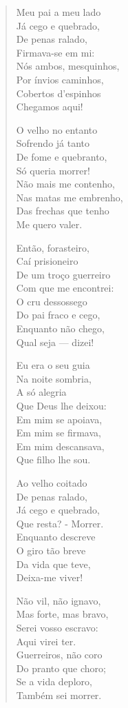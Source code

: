 \begin{verse}
Meu pai a meu lado \\
Já cego e quebrado, \\
De penas ralado, \\
Firmava-se em mi: \\
Nós ambos, mesquinhos, \\
Por ínvios caminhos, \\
Cobertos d’espinhos \\
Chegamos aqui!
						
O velho no entanto \\
Sofrendo já tanto \\
De fome e quebranto, \\
Só queria morrer! \\
Não mais me contenho, \\
Nas matas me embrenho, \\
Das frechas que tenho \\
Me quero valer.
						
Então, forasteiro, \\
Caí prisioneiro \\
De um troço guerreiro \\
Com que me encontrei: \\
O cru dessossego \\
Do pai fraco e cego, \\
Enquanto não chego, \\
Qual seja — dizei!
						
Eu era o seu guia \\
Na noite sombria, \\
A só alegria \\
Que Deus lhe deixou: \\
Em mim se apoiava, \\
Em mim se firmava, \\
Em mim descansava, \\
Que filho lhe sou.
						
Ao velho coitado \\
De penas ralado, \\
Já cego e quebrado, \\
Que resta? - Morrer. \\
Enquanto descreve \\
O giro tão breve \\
Da vida que teve, \\
Deixa-me viver!
						
Não vil, não ignavo, \\
Mas forte, mas bravo, \\
Serei vosso escravo: \\
Aqui virei ter. \\
Guerreiros, não coro \\
Do pranto que choro; \\
Se a vida deploro, \\
Também sei morrer.
\end{verse}

